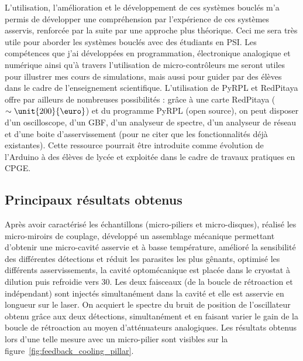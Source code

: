 \documentclass[12pt,a4paper]{article}
\newenvironment{mep}{%
\addcontentsline{ldf}{figure}{0}%
\begin{mep_env}
\small}
{\end{mep_env}}
\begin{document}
\begin{mep}
L'utilisation, l'amélioration et le développement de ces systèmes bouclés m'a permis de développer une compréhension par l'expérience de ces systèmes asservis, renforcée par la suite par une approche plus théorique.
Ceci me sera très utile pour aborder les systèmes bouclés avec des étudiants en PSI.
Les compétences que j'ai développées en programmation, électronique analogique et numérique ainsi qu'à travers l'utilisation de micro-contrôleurs me seront utiles pour illustrer mes cours de simulations, mais aussi pour guider par des élèves dans le cadre de l'enseignement scientifique.
L'utilisation de PyRPL et RedPitaya offre par ailleurs de nombreuses possibilités : grâce à une carte RedPitaya ($\sim\unit{200}{\text{\euro}}$) et du programme PyRPL (open source), on peut disposer d'un oscilloscope, d'un GBF, d'un analyseur de spectre, d'un analyseur de réseau et d'une boite d'asservissement (pour ne citer que les fonctionnalités déjà existantes).
Cette ressource pourrait être introduite comme évolution de l'Arduino à des élèves de lycée et exploitée dans le cadre de travaux pratiques en CPGE.
\end{mep}

\subsection{Principaux résultats obtenus}

Après avoir caractérisé les échantillons (micro-piliers et micro-disques), réalisé les micro-miroirs de couplage, développé un assemblage mécanique permettant d'obtenir une micro-cavité asservie et à basse température, amélioré la sensibilité des différentes détections et réduit les parasites les plus gênants, optimisé les différents asservissements, la cavité optomécanique est placée dans le cryostat à dilution puis refroidie vers \unit{30}{\milli\kelvin}.
Les deux faisceaux (de la boucle de rétroaction et indépendant) sont injectés simultanément dans la cavité et elle est asservie en longueur sur le laser.
On acquiert le spectre du bruit de position de l'oscillateur obtenu grâce aux deux détections, simultanément et en faisant varier le gain de la boucle de rétroaction au moyen d'atténuateurs analogiques.
Les résultats obtenus lors d'une telle mesure avec un micro-pilier sont visibles sur la figure~\ref{fig:feedback_cooling_pillar}.
\end{document}
